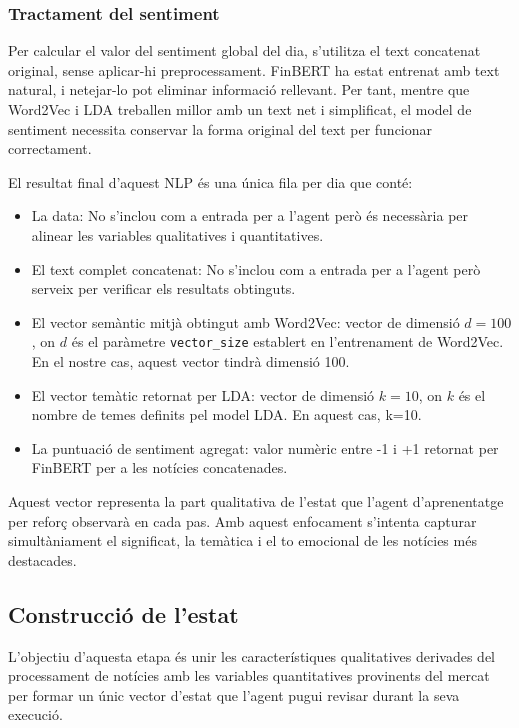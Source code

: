 \documentclass[12pt,a4paper,twoside]{book}
\begin{document}
\subsubsection{Tractament del sentiment}

Per calcular el valor del sentiment global del dia, s'utilitza el text concatenat original, sense aplicar-hi preprocessament. FinBERT ha estat entrenat amb text natural, i netejar-lo pot eliminar informació rellevant. Per tant, mentre que Word2Vec i LDA treballen millor amb un text net i simplificat, el model de sentiment necessita conservar la forma original del text per funcionar correctament.

El resultat final d'aquest NLP és una única fila per dia que conté:

\begin{itemize}
    \item La data: No s'inclou com a entrada per a l'agent però és necessària per alinear les variables qualitatives i quantitatives.

    \item El text complet concatenat: No s'inclou com a entrada per a l'agent però serveix per verificar els resultats obtinguts.

    \item El vector semàntic mitjà obtingut amb Word2Vec: vector de dimensió $d=100$, on $d$ és el paràmetre \texttt{vector\_size} establert en l'entrenament de Word2Vec. En el nostre cas, aquest vector tindrà dimensió 100.

    \item El vector temàtic retornat per LDA: vector de dimensió $k=10$, on $k$ és el nombre de temes definits pel model LDA. En aquest cas, k=10.

    \item La puntuació de sentiment agregat: valor numèric entre -1 i +1 retornat per FinBERT per a les notícies concatenades.
\end{itemize}

Aquest vector representa la part qualitativa de l'estat que l'agent d'aprenentatge per reforç observarà en cada pas. Amb aquest enfocament s'intenta capturar simultàniament el significat, la temàtica i el to emocional de les notícies més destacades.


\subsection{Construcció de l'estat}

L'objectiu d'aquesta etapa és unir les característiques qualitatives derivades del processament de notícies amb les variables quantitatives provinents del mercat per formar un únic vector d'estat que l'agent pugui revisar durant la seva execució.
\end{document}
